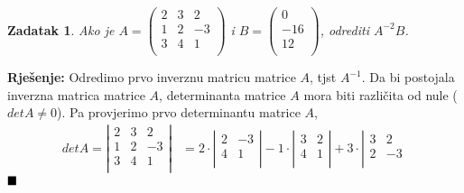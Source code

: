\documentclass{article}
\newtheorem{theorem}{\textbf{Zadatak}}
\newenvironment{solution}{\noindent\textbf{Rje\v senje:\newline}}{$\hfill\blacksquare$}
\begin{document}
\begin{theorem}
    Ako je
        \(A=\left(
        \begin{array}{ccc}
            2 & 3 & 2 \\
            1 & 2 & -3 \\
            3 & 4 & 1 \\
        \end{array}
        \right)\)
    i
    \(B=\left(
    \begin{array}{c}
        0 \\
        -16 \\
        12 \\
    \end{array}
    \right)\),
    odrediti $A^{-2}B$.
\end{theorem}

\begin{solution}
    Odredimo prvo inverznu matricu matrice $A$, tjst $A^{-1}$.
    Da bi postojala inverzna matrica matrice $A$, determinanta matrice $A$ mora biti razli\v cita od nule ($detA\neq 0$).
    Pa provjerimo prvo determinantu matrice $A$,
    \newline
    \begin{equation*}
        \begin{aligned}
            detA=\left|
            \begin{array}{ccc}
                2 & 3 & 2 \\
                1 & 2 & -3 \\
                3 & 4 & 1 \\
            \end{array}
            \right|
            &=2\cdot \left|
            \begin{array}{cc}
                2 & -3 \\
                4 & 1 \\
            \end{array}
            \right| -
            1\cdot \left|
            \begin{array}{cc}
                3 & 2 \\
                4 & 1 \\
            \end{array}
            \right| +
            3\cdot \left|
            \begin{array}{cc}
                3 & 2 \\
                2 & -3 \\
            \end{array}

\end{aligned}
\end{equation*}
\end{solution}
\end{document}
